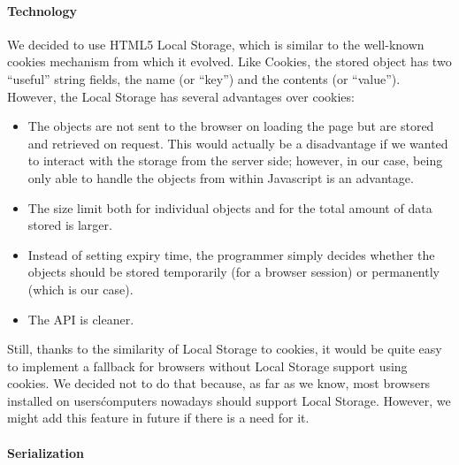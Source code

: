 \paragraph{Technology}

We decided to use HTML5 Local Storage, which is similar to the well-known cookies mechanism from which it evolved.
Like Cookies, the stored object has two ``useful'' string fields, the name (or ``key'') and the contents (or ``value'').
However, the Local Storage has several advantages over cookies:

\begin{itemize}
\item The objects are not sent to the browser on loading the page but are stored and retrieved on request. This would actually be a disadvantage if we wanted to interact with the storage from the server side; however, in our case, being only able to handle the objects from within Javascript is an advantage.
\item The size limit both for individual objects and for the total amount of data stored is larger.
\item Instead of setting expiry time, the programmer simply decides whether the objects should be stored temporarily (for a browser session) or permanently (which is our case).
\item The API is cleaner.
\end{itemize}

Still, thanks to the similarity of Local Storage to cookies, it would be quite easy to implement a fallback for browsers without Local Storage support using cookies. We decided not to do that because, as far as we know, most browsers installed on users\' computers nowadays should support Local Storage. However, we might add this feature in future if there is a need for it.

\paragraph{Serialization}
\label{par:process_serialization}

